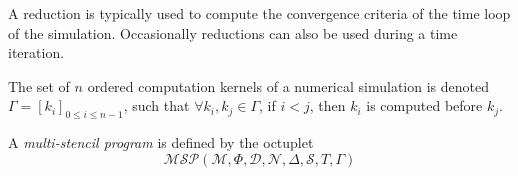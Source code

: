 


A reduction is typically used to compute the convergence criteria of the time loop of the simulation. Occasionally reductions can also be used during a time iteration.


\begin{mydef}
The set of $n$ ordered computation kernels of a numerical simulation is denoted $\Gamma = [k_i]_{0 \leq i \leq n-1}$, such that $\forall k_i,k_j \in \Gamma$, if $i < j$, then $k_i$ is computed before $k_j$.
\end{mydef}

\begin{mydef}
A \textit{multi-stencil program} is defined by the octuplet 
\begin{equation*}
\mathcal{MSP}(\mathcal{M},\Phi,\mathcal{D},\mathcal{N},\Delta, \mathcal{S},T,\Gamma)
\end{equation*}
\end{mydef}



